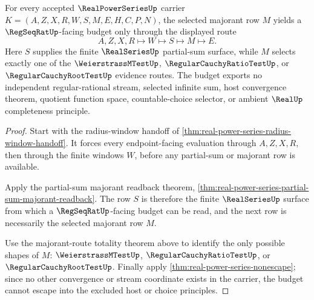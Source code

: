 \begin{theorem}\label{thm:real-power-series-majorant-regseqrat-budget}
For every accepted $\RealPowerSeriesUp$ carrier $K=(A,Z,X,R,W,S,M,E,H,C,P,N)$, the selected majorant row $M$ yields a $\RegSeqRatUp$-facing budget only through the displayed route
$$
A,Z,X,R\longmapsto W\longmapsto S\longmapsto M\longmapsto E.
$$
Here $S$ supplies the finite $\RealSeriesUp$ partial-sum surface, while $M$ selects exactly one of the $\WeierstrassMTestUp$, $\RegularCauchyRatioTestUp$, or $\RegularCauchyRootTestUp$ evidence routes. The budget exports no independent regular-rational stream, selected infinite sum, host convergence theorem, quotient function space, countable-choice selector, or ambient $\RealUp$ completeness principle.
\end{theorem}
\begin{proof}
Start with the radius-window handoff of \autoref{thm:real-power-series-radius-window-handoff}. It forces every endpoint-facing evaluation through $A,Z,X,R$, then through the finite windows $W$, before any partial-sum or majorant row is available.

Apply the partial-sum majorant readback theorem, \autoref{thm:real-power-series-partial-sum-majorant-readback}. The row $S$ is therefore the finite $\RealSeriesUp$ surface from which a $\RegSeqRatUp$-facing budget can be read, and the next row is necessarily the selected majorant row $M$.

Use the majorant-route totality theorem above to identify the only possible shapes of $M$: $\WeierstrassMTestUp$, $\RegularCauchyRatioTestUp$, or $\RegularCauchyRootTestUp$. Finally apply \autoref{thm:real-power-series-nonescape}; since no other convergence or stream coordinate exists in the carrier, the budget cannot escape into the excluded host or choice principles.
\end{proof}

